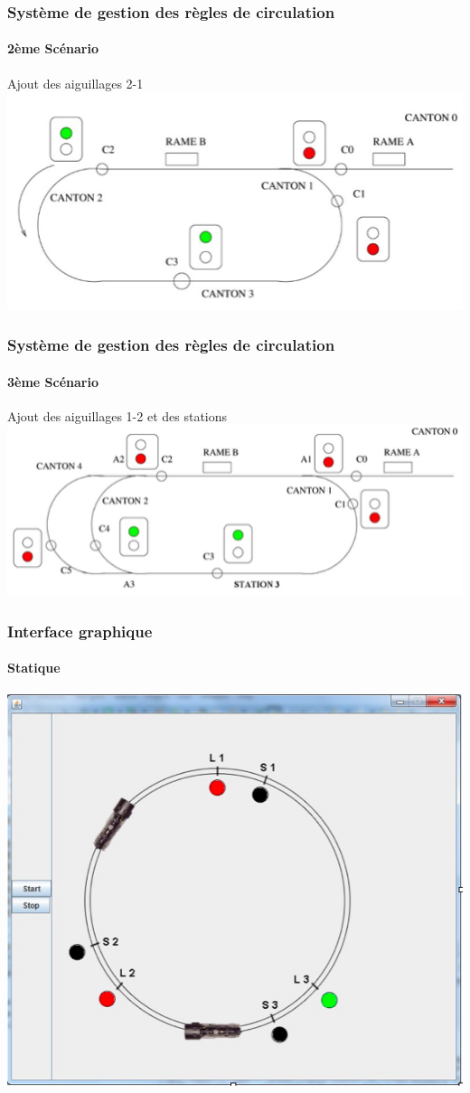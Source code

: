 \begin{frame}
  \frametitle{Système de gestion des règles de circulation}
  \framesubtitle{2ème Scénario}
  Ajout des aiguillages 2-1
  \vspace{1em}
  \includegraphics[scale=0.65]{include/scenario2.png}
\end{frame}

\begin{frame}
  \frametitle{Système de gestion des règles de circulation}
  \framesubtitle{3ème Scénario}
  Ajout des aiguillages 1-2 et des stations
  \vspace{1em}
  \includegraphics[scale=0.60]{include/scenario3.png}
\end{frame}


\begin{frame}
  \frametitle{Interface graphique}
  \framesubtitle{Statique}
  \includegraphics[scale=0.45]{include/ihmStat.png}
\end{frame}

